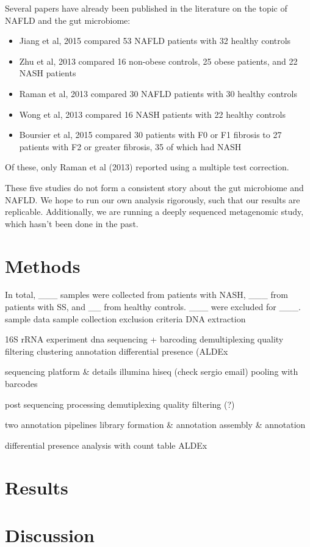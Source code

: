 Several papers have already been published in the literature on the topic of NAFLD and the gut microbiome:

\begin{itemize}
\item Jiang et al, 2015 compared 53 NAFLD patients with 32 healthy controls

\item Zhu et al, 2013 compared 16 non-obese controls, 25 obese patients, and 22 NASH patients

\item Raman et al, 2013 compared 30 NAFLD patients with 30 healthy controls

\item Wong et al, 2013 compared 16 NASH patients with 22 healthy controls

\item Boursier et al, 2015 compared 30 patients with F0 or F1 fibrosis to 27 patients with F2 or greater fibrosis, 35 of which had NASH
\end{itemize}

Of these, only Raman et al (2013) reported using a multiple test correction.

These five studies do not form a consistent story about the gut microbiome and NAFLD. We hope to run our own analysis rigorously, such that our results are replicable. Additionally, we are running a deeply sequenced metagenomic study, which hasn’t been done in the past.

\section{Methods}
In total, ___ samples were collected from patients with NASH, ___ from patients with SS, and __ from healthy controls. ___ were excluded for ___.
sample data
sample collection
exclusion criteria
DNA extraction

16S rRNA experiment
dna sequencing + barcoding
demultiplexing
quality filtering
clustering
annotation
differential presence (ALDEx

sequencing platform & details
illumina hiseq (check sergio email)
pooling with barcodes

post sequencing processing
demutiplexing
quality filtering (?)

two annotation pipelines
library formation & annotation
assembly & annotation

differential presence analysis with count table
ALDEx
\section{Results}
\section{Discussion}